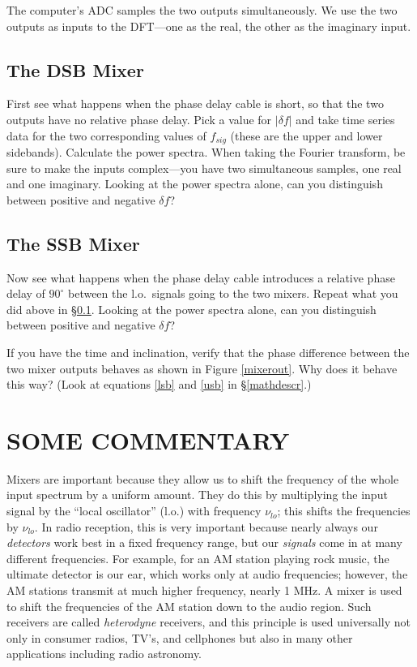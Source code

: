 \documentclass[11pt,preprint]{aastex}
\begin{document}
The computer's ADC samples the two outputs simultaneously. We use the
two outputs as inputs to the DFT---one as the real, the other as the
imaginary input.

\subsection{The DSB Mixer} \label{dsbmixer}

First see what happens when the phase delay cable is short, so that the
two outputs have no relative phase delay. Pick a value for $|\delta f|$
and take time series data for the two corresponding values of $f_{sig}$
(these are the upper and lower sidebands). Calculate the power
spectra. When taking the Fourier transform, be sure to make the inputs
complex---you have two simultaneous samples, one real and one
imaginary. Looking at the power spectra alone, can you distinguish
between positive and negative $\delta f$?

\subsection{The SSB Mixer}

Now see what happens when the phase delay cable introduces a relative
phase delay of $90^\circ$ between the l.o.\ signals going to the two
mixers.  Repeat what you did above in \S \ref{dsbmixer}. Looking at the
power spectra alone, can you distinguish between positive and negative
$\delta f$?

If you have the time and inclination, verify that the phase difference
between the two mixer outputs behaves as shown in Figure \ref{mixerout}.
Why does it behave this way?  (Look at equations \ref{lsb} and \ref{usb}
in \S \ref{mathdescr}.)

\section {SOME COMMENTARY}

Mixers are important because they allow us to shift the
frequency of the whole input spectrum by a uniform amount.  They do this
by multiplying the input signal by the ``local oscillator'' (l.o.) with
frequency $\nu_{lo}$; this shifts the frequencies by $\nu_{lo}$.  In radio
reception, this is very important because nearly always our {\it
detectors} work best in a fixed frequency range, but our {\it signals}
come in at many different frequencies.  For example, for an AM station
playing rock music, the ultimate detector is our ear, which works only
at audio frequencies; however, the AM stations transmit at much higher
frequency, nearly 1 MHz.  A mixer is used to shift the frequencies of
the AM station down to the audio region.  Such receivers are called {\it
heterodyne} receivers, and this principle is used universally not only
in consumer radios, TV's, and cellphones but also in many other
applications including radio astronomy.
\end{document}

